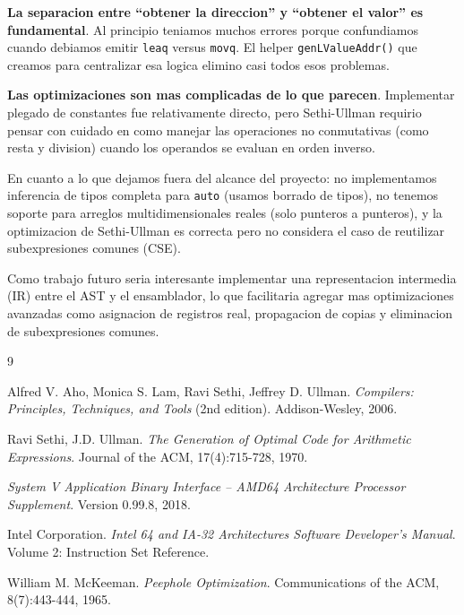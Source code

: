 \documentclass[12pt, a4paper]{article}
\begin{document}
\textbf{La separacion entre ``obtener la direccion'' y ``obtener el valor'' es fundamental}. Al principio teniamos muchos errores porque confundiamos cuando debiamos emitir \texttt{leaq} versus \texttt{movq}. El helper \texttt{genLValueAddr()} que creamos para centralizar esa logica elimino casi todos esos problemas.

\textbf{Las optimizaciones son mas complicadas de lo que parecen}. Implementar plegado de constantes fue relativamente directo, pero Sethi-Ullman requirio pensar con cuidado en como manejar las operaciones no conmutativas (como resta y division) cuando los operandos se evaluan en orden inverso.

En cuanto a lo que dejamos fuera del alcance del proyecto: no implementamos inferencia de tipos completa para \texttt{auto} (usamos borrado de tipos), no tenemos soporte para arreglos multidimensionales reales (solo punteros a punteros), y la optimizacion de Sethi-Ullman es correcta pero no considera el caso de reutilizar subexpresiones comunes (CSE).

Como trabajo futuro seria interesante implementar una representacion intermedia (IR) entre el AST y el ensamblador, lo que facilitaria agregar mas optimizaciones avanzadas como asignacion de registros real, propagacion de copias y eliminacion de subexpresiones comunes.

\newpage

\begin{thebibliography}{9}

Alfred V. Aho, Monica S. Lam, Ravi Sethi, Jeffrey D. Ullman.
\textit{Compilers: Principles, Techniques, and Tools} (2nd edition).
Addison-Wesley, 2006.

Ravi Sethi, J.D. Ullman.
\textit{The Generation of Optimal Code for Arithmetic Expressions}.
Journal of the ACM, 17(4):715-728, 1970.

\textit{System V Application Binary Interface -- AMD64 Architecture Processor Supplement}.
Version 0.99.8, 2018.

Intel Corporation.
\textit{Intel 64 and IA-32 Architectures Software Developer's Manual}.
Volume 2: Instruction Set Reference.

William M. McKeeman.
\textit{Peephole Optimization}.
Communications of the ACM, 8(7):443-444, 1965.

\end{thebibliography}
\end{document}
